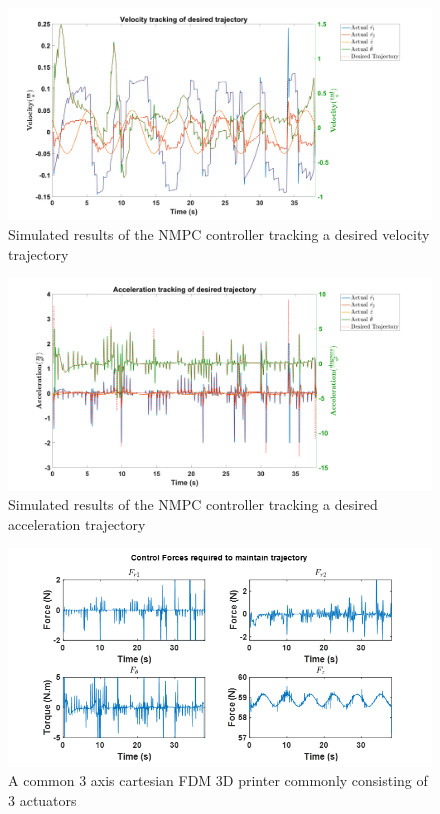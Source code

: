\documentclass{UoNMCHA}
\numberwithin{equation}{section}
\begin{document}
	
	\begin{figure}[H]
		\begin{center}
			\includegraphics[width=1\linewidth]{figs/Picture34}
			\caption{Simulated results of the NMPC controller tracking a desired velocity trajectory}
			\label{figs/Picture34}
		\end{center}
	\end{figure}
	

	
	\begin{figure}[H]
		\begin{center}
			\includegraphics[width=1\linewidth]{figs/Picture35}
			\caption{Simulated results of the NMPC controller tracking a desired acceleration trajectory}
			\label{figs/Picture35}
		\end{center}
	\end{figure}
	

	
	\begin{figure}[H]
		\begin{center}
			\includegraphics[width=1\linewidth]{figs/Picture36}
			\caption{A  common 3 axis cartesian FDM 3D printer commonly consisting of 3 actuators}
			\label{figs/Picture36}
		\end{center}
	\end{figure}
	
\end{document}
